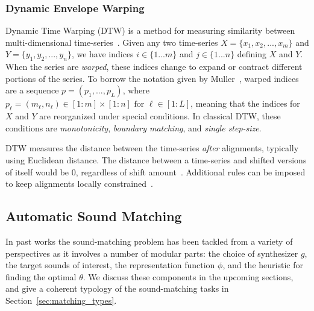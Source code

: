 \documentclass[lettersize,journal]{IEEEtran}
\begin{document}
\subsubsection{Dynamic Envelope Warping}
Dynamic Time Warping (DTW) is a method for measuring similarity between multi-dimensional time-series~\cite{rabiner1993fundamentals,muller2007dynamic,giorgino2009computing}. Given any two time-series $X = \{x_1,x_2,...,x_m\}$ and $Y = \{y_1,y_2,...,y_n\}$, we have indices $i\in\{1...m\}$ and $j\in\{1...n\}$ defining $X$ and $Y$. When the series are \textit{warped}, these indices change to expand or contract different portions of the series. To borrow the notation given by Muller~\cite{muller2007dynamic}, warped indices are a sequence $p=(p_1,...,p_L)$, where \(p_\ell = (m_\ell, n_\ell) \in [1 : m] \times [1 : n] \text{ for } \ell \in [1 : L]\), meaning that the indices for $X$ and $Y$ are reorganized under special conditions. In classical DTW, these conditions are \textit{monotonicity}, \textit{boundary matching}, and \textit{single step-size}.

DTW measures the distance between the time-series \textit{after} alignments, typically using Euclidean distance. The distance between a time-series and shifted versions of itself would be 0, regardless of shift amount~\cite{tavenard.blog.dtw}. Additional rules can be imposed to keep alignments locally constrained~\cite{itakura1975minimum,sakoe1978dynamic}.

\subsection{Automatic Sound Matching}
\label{sec:sound_matching_definition}
In past works the sound-matching problem has been tackled from a variety of perspectives as it involves a number of modular parts: the choice of synthesizer $g$, the target sounds of interest, the representation function $\phi$, and the heuristic for finding the optimal $\theta$. We discuss these components in the upcoming sections, and give a coherent typology of the sound-matching tasks in Section~\ref{sec:matching_types}. 
\end{document}
